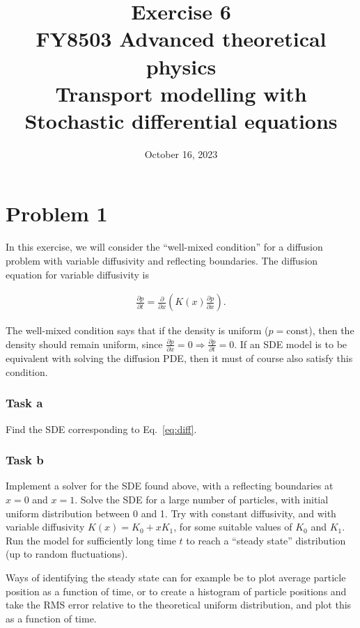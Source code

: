 \documentclass[a4paper]{article}
\title{\vspace{-3em} Exercise 6\\[10pt] \large FY8503 Advanced theoretical physics\\  Transport modelling with Stochastic differential equations}
\author{October 16, 2023}
\date{}
\begin{document}
\maketitle



\section*{Problem 1}

In this exercise, we will consider the ``well-mixed condition'' for a diffusion problem with variable diffusivity and reflecting boundaries.
The diffusion equation for variable diffusivity is

\begin{align}
    \label{eq:diff}
    \frac{\partial p}{\partial t} = \frac{\partial }{\partial x} \left( K(x) \frac{\partial p}{\partial x}\right).
\end{align}

The well-mixed condition says that if the density is uniform ($p=\mathrm{const}$), then the density should remain uniform, since $\frac{\partial p}{\partial x}=0 \Rightarrow \frac{\partial p}{\partial t}=0$. If an SDE model is to be equivalent with solving the diffusion PDE, then it must of course also satisfy this condition.


\subsubsection*{Task a}

Find the SDE corresponding to Eq.~\eqref{eq:diff}.


\subsubsection*{Task b}

Implement a solver for the SDE found above, with a reflecting boundaries at $x=0$ and $x=1$. Solve the SDE for a large number of particles, with initial uniform distribution between 0 and 1. Try with constant diffusivity, and with variable diffusivity $K(x) = K_0 + x K_1 $, for some suitable values of $K_0$ and $K_1$. Run the model for sufficiently long time $t$ to reach a ``steady state'' distribution (up to random fluctuations).

Ways of identifying the steady state can for example be to plot average particle position as a function of time, or to create a histogram of particle positions and take the RMS error relative to the theoretical uniform distribution, and plot this as a function of time.
\end{document}
